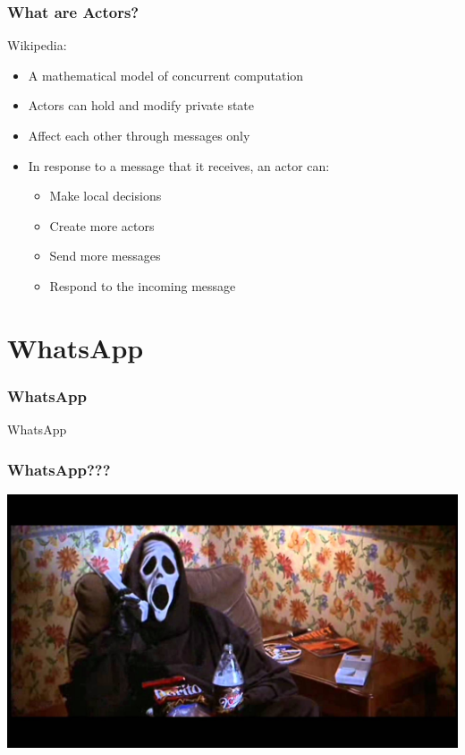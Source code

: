 \documentclass{beamer}
\begin{document}

\begin{frame}
\frametitle{What are Actors?}
Wikipedia:
\begin{itemize}
\item A mathematical model of concurrent computation
\item Actors can hold and modify private state
\item Affect each other through messages only
\item In response to a message that it receives, an actor can:
\begin{itemize}
\item Make local decisions
\item Create more actors
\item Send more messages
\item Respond to the incoming message
\end{itemize}
\end{itemize}
\end{frame}


\section{WhatsApp}

\begin{frame}
\frametitle{WhatsApp}
\Huge{\centerline{WhatsApp}}
\end{frame}



\begin{frame}
\frametitle{WhatsApp???}
\includegraphics[width=0.8\linewidth]{./whatsup.jpg}
\end{frame}

\end{document}
